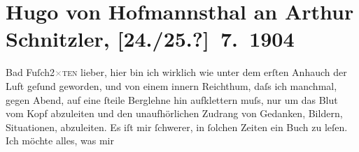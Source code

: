 

         
         \renewcommand{\erwaehntePersonen}{Personen: Pedro Calderón de la Barca,  Euripides, Johann Wolfgang von Goethe, Hugo August von Hofmannsthal, Friedrich von Schiller}
         \renewcommand{\erwaehnteInstitutionen}{Institutionen: S. Fischer Verlag}
         \renewcommand{\erwaehnteOrte}{Orte: Bad Fusch, Ramgut, Wien}
         \renewcommand{\erwaehnteWerke}{Werke: Briefwechsel zwischen Schiller und Goethe, Das gerettete Venedig. Trauerspiel in fünf Aufzügen, Der Turm. Ein Trauerspiel, Die Bakchen, Elektra. Tragödie in einem Aufzug, Linzer Tages-Post, Orest in Delphi, Pentheus. Trauerspiel in zwei Aufzügen}
               \section[Hugo von Hofmannsthal an Arthur Schnitzler, {[}24./25.?{]} 7. 1904]{ Hugo von Hofmannsthal an Arthur Schnitzler, {[}24./25.?{]} 7. 1904}\nopagebreak{}\rehead{ }\begin{ledgroupsized}[t]{13cm}\normalsize\beginnumbering \toendnotes[C]{\smallbreak\pagebreak[2]} 
\toendnotes[C]{\smallbreak}\pstart
           \raggedleft{}{\pb}Bad Fuſch2\textcolor{gray}{×}\textsc{ten}\pend
           \pstart{}lieber, \pend\pstart
           hier bin ich wirklich wie unter dem erſten Anhauch der Luft geſund geworden, und von
               einem innern Reichthum, daſs ich manchmal, gegen Abend, auf eine ſteile Berglehne hin
               aufklettern muſs, nur um das Blut vom Kopf abzuleiten und den unaufhörlichen {\pb}Zudrang von Gedanken, Bildern,
               Situationen, abzuleiten.\pend
           \pstart
           Es iſt mir ſchwerer, in ſolchen Zeiten ein Buch zu leſen. Ich möchte alles, was mir

\end{ledgroupsized}

